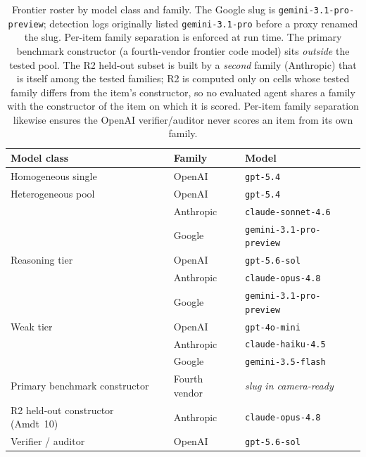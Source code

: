 \documentclass[acmsmall,screen,review,anonymous]{acmart}
\begin{document}
\begin{table}[t]
\centering
\small
\caption{Frontier roster by model class and family. The Google slug is
\texttt{gemini-3.1-pro-preview}; detection logs originally listed \texttt{gemini-3.1-pro} before a proxy
renamed the slug. Per-item family
separation is enforced at run time. The primary benchmark constructor (a fourth-vendor frontier code model)
sits \emph{outside} the tested pool. The R2 held-out subset is built by a \emph{second} family
(Anthropic) that is itself among the tested families; R2 is computed only on cells whose tested family
differs from the item's constructor, so no evaluated agent shares a family with the constructor of the item
on which it is scored. Per-item family separation likewise ensures the OpenAI verifier/auditor never scores
an item from its own family.}
\label{tab:roster}
\begin{tabular}{@{}lll@{}}
\toprule
Model class & Family & Model \\
\midrule
Homogeneous single & OpenAI & \texttt{gpt-5.4} \\
\addlinespace
Heterogeneous pool  & OpenAI    & \texttt{gpt-5.4} \\
                    & Anthropic & \texttt{claude-sonnet-4.6} \\
                    & Google    & \texttt{gemini-3.1-pro-preview} \\
\addlinespace
Reasoning tier      & OpenAI    & \texttt{gpt-5.6-sol} \\
                    & Anthropic & \texttt{claude-opus-4.8} \\
                    & Google    & \texttt{gemini-3.1-pro-preview} \\
\addlinespace
Weak tier           & OpenAI    & \texttt{gpt-4o-mini} \\
                    & Anthropic & \texttt{claude-haiku-4.5} \\
                    & Google    & \texttt{gemini-3.5-flash} \\
\midrule
Primary benchmark constructor & Fourth vendor & \emph{slug in camera-ready} \\
R2 held-out constructor (Amdt~10) & Anthropic & \texttt{claude-opus-4.8} \\
Verifier / auditor  & OpenAI    & \texttt{gpt-5.6-sol} \\
\bottomrule
\end{tabular}
\end{table}
\end{document}
